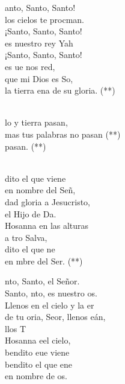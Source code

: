 \documentclass[12pt]{article}
\begin{document}
\begin{multicols*}{2}
\begin{cancion}[Santo][Carismático]%
	anto, Santo, Santo! \\
	los cielos te procman.\\
¡Santo, Santo, Santo! \\
	es nuestro rey Yah\\
¡Santo, Santo, Santo! \\
	es ue nos red,\\
	que mi Dios es So, \\
	la tierra ena de su gloria. (**)\\\jump\\
	\begin{chorus}%
	lo y tierra pasan, \\
	mas tus palabras no pasan (**)\\
	   pasan. (**)\\
	\end{chorus}%
	\jump\\
	dito el que viene \\
	en nombre del Señ, \\
dad gloria a Jesucristo, \\
	el Hijo de Da.\\
Hosanna en las alturas \\
	a tro Salva,\\
	dito el que ne \\
	en mbre del Ser. (**)\\
\end{cancion}%

\begin{cancion}[Santo][Estepa]%
	nto, Santo, el Señor.\\
	Santo, nto, es nuestro os.\\
	Llenos en el cielo y la er\\
	de tu oria, Seor, llenos eán,\\
	llos T\\
	Hosanna eel cielo, \\
	bendito eue viene\\
	bendito el que ene \\
	en nombre de os.\\
\end{cancion}%


\end{multicols*}
\end{document}

